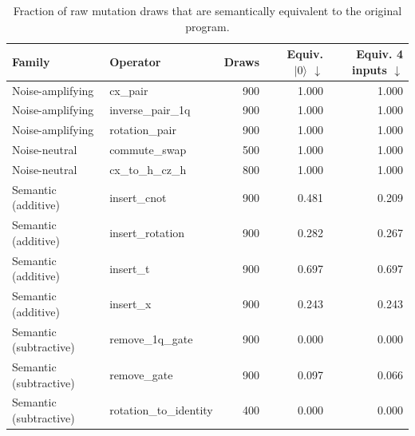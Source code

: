 \begin{table}[t]
\centering
\caption{Fraction of raw mutation draws that are semantically equivalent to the original program.}
\label{tab:rq2-census}
\small
\begin{tabular}{llrrr}
\toprule
Family & Operator & Draws & Equiv. $|0\rangle$ $\downarrow$ & Equiv. 4 inputs $\downarrow$ \\
\midrule
Noise-amplifying & cx\_pair & 900 & 1.000 & 1.000 \\
Noise-amplifying & inverse\_pair\_1q & 900 & 1.000 & 1.000 \\
Noise-amplifying & rotation\_pair & 900 & 1.000 & 1.000 \\
Noise-neutral & commute\_swap & 500 & 1.000 & 1.000 \\
Noise-neutral & cx\_to\_h\_cz\_h & 800 & 1.000 & 1.000 \\
Semantic (additive) & insert\_cnot & 900 & 0.481 & 0.209 \\
Semantic (additive) & insert\_rotation & 900 & 0.282 & 0.267 \\
Semantic (additive) & insert\_t & 900 & 0.697 & 0.697 \\
Semantic (additive) & insert\_x & 900 & 0.243 & 0.243 \\
Semantic (subtractive) & remove\_1q\_gate & 900 & 0.000 & 0.000 \\
Semantic (subtractive) & remove\_gate & 900 & 0.097 & 0.066 \\
Semantic (subtractive) & rotation\_to\_identity & 400 & 0.000 & 0.000 \\
\bottomrule
\end{tabular}
\end{table}
